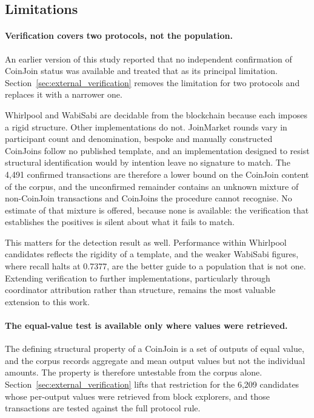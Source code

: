 \documentclass[12pt,a4paper]{article}
\begin{document}
\subsection{Limitations}

\paragraph{Verification covers two protocols, not the population.}
An earlier version of this study reported that no independent
confirmation of CoinJoin status was available and treated that as
its principal limitation. Section~\ref{sec:external_verification}
removes the limitation for two protocols and replaces it with a
narrower one.

Whirlpool and WabiSabi are decidable from the blockchain because
each imposes a rigid structure. Other implementations do not.
JoinMarket rounds vary in participant count and denomination,
bespoke and manually constructed CoinJoins follow no published
template, and an implementation designed to resist structural
identification would by intention leave no signature to match.
The 4{,}491 confirmed transactions are therefore a lower bound on
the CoinJoin content of the corpus, and the unconfirmed remainder
contains an unknown mixture of non-CoinJoin transactions and
CoinJoins the procedure cannot recognise. No estimate of that
mixture is offered, because none is available: the verification
that establishes the positives is silent about what it fails to
match.

This matters for the detection result as well. Performance within
Whirlpool candidates reflects the rigidity of a template, and the
weaker WabiSabi figures, where recall halts at 0.7377, are the
better guide to a population that is not one. Extending
verification to further implementations, particularly through
coordinator attribution rather than structure, remains the most
valuable extension to this work.

\paragraph{The equal-value test is available only where values
were retrieved.}
The defining structural property of a CoinJoin is a set of
outputs of equal value, and the corpus records aggregate and mean
output values but not the individual amounts. The property is
therefore untestable from the corpus alone.
Section~\ref{sec:external_verification} lifts that restriction for
the 6{,}209 candidates whose per-output values were retrieved
from block explorers, and those transactions are tested against
the full protocol rule.
\end{document}
